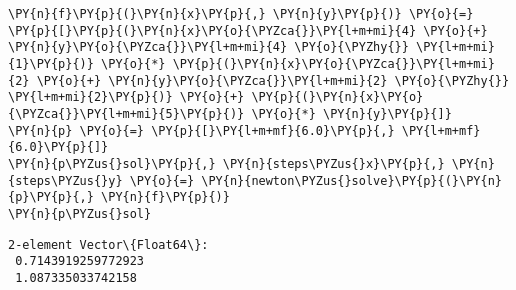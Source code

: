     \begin{tcolorbox}[breakable, size=fbox, boxrule=1pt, pad at break*=1mm,colback=cellbackground, colframe=cellborder]
\begin{Verbatim}[commandchars=\\\{\}]
\PY{n}{f}\PY{p}{(}\PY{n}{x}\PY{p}{,} \PY{n}{y}\PY{p}{)} \PY{o}{=} \PY{p}{[}\PY{p}{(}\PY{n}{x}\PY{o}{\PYZca{}}\PY{l+m+mi}{4} \PY{o}{+} \PY{n}{y}\PY{o}{\PYZca{}}\PY{l+m+mi}{4} \PY{o}{\PYZhy{}} \PY{l+m+mi}{1}\PY{p}{)} \PY{o}{*} \PY{p}{(}\PY{n}{x}\PY{o}{\PYZca{}}\PY{l+m+mi}{2} \PY{o}{+} \PY{n}{y}\PY{o}{\PYZca{}}\PY{l+m+mi}{2} \PY{o}{\PYZhy{}} \PY{l+m+mi}{2}\PY{p}{)} \PY{o}{+} \PY{p}{(}\PY{n}{x}\PY{o}{\PYZca{}}\PY{l+m+mi}{5}\PY{p}{)} \PY{o}{*} \PY{n}{y}\PY{p}{]}
\PY{n}{p} \PY{o}{=} \PY{p}{[}\PY{l+m+mf}{6.0}\PY{p}{,} \PY{l+m+mf}{6.0}\PY{p}{]}
\PY{n}{p\PYZus{}sol}\PY{p}{,} \PY{n}{steps\PYZus{}x}\PY{p}{,} \PY{n}{steps\PYZus{}y} \PY{o}{=} \PY{n}{newton\PYZus{}solve}\PY{p}{(}\PY{n}{p}\PY{p}{,} \PY{n}{f}\PY{p}{)}
\PY{n}{p\PYZus{}sol}
\end{Verbatim}
\end{tcolorbox}

            \begin{tcolorbox}[breakable, size=fbox, boxrule=.5pt, pad at break*=1mm, opacityfill=0]
\begin{Verbatim}[commandchars=\\\{\}]
2-element Vector\{Float64\}:
 0.7143919259772923
 1.087335033742158
\end{Verbatim}
\end{tcolorbox}